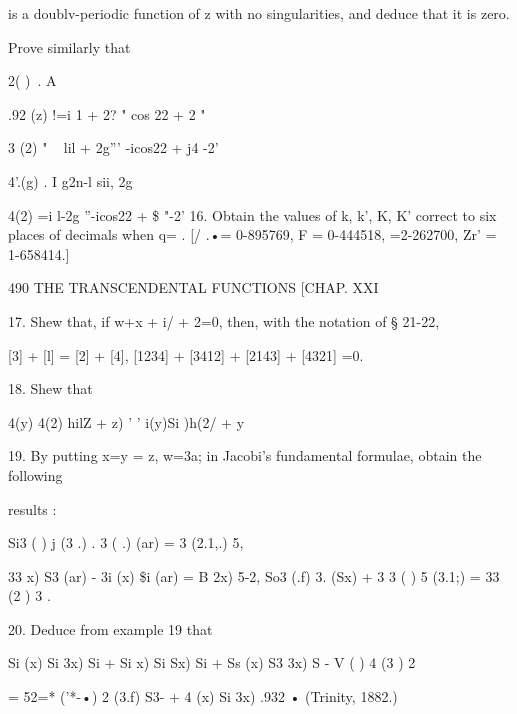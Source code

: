 is a doublv-periodic function of z with no singularities, and deduce
that it is zero.

Prove similarly that

 2( )\ . A%

.92 (z) !=i 1 + 2? " cos 22 + 2 "

 3 (2) " ~ lil + 2g''' -icos22 + j4 -2'

 4'.(g) . I g2n-l sii, 2g

  4(2) =i l-2g ''-icos22 + \$ "-2' 16. Obtain the values of k, k', K,
K' correct to six places of decimals when q= . [/ .•= 0-895769, F =
0-444518, =2-262700, Zr' = 1-658414.]

490 THE TRANSCENDENTAL FUNCTIONS [CHAP. XXI

17. Shew that, if w+x + i/ + 2=0, then, with the notation of § 21-22,

[3] + [l] = [2] + [4], [1234] + [3412] + [2143] + [4321] =0.

18. Shew that

 4(y) 4(2) hilZ + z) ' ' i(y)Si )h(2/ + y

19. By putting x=y = z, w=3a; in Jacobi's fundamental formulae, obtain
the following

results :

Si3 ( ) j (3 .) . 3 ( .) (ar) = 3 (2.1,.) 5,

 33 x) S3 (ar) - 3i (x) \$i (ar) = B 2x) 5-2, So3 (.f) 3. (Sx) + 3 3 (
) 5 (3.1;) = 33 (2 ) 3 .

20. Deduce from example 19 that

 Si (x) Si 3x) Si + Si x) Si Sx) Si + Ss (x) S3 3x) S - V ( ) 4 (3 ) 2

= 52=* ('*-•) 2 (3.f) S3- + 4 (x) Si 3x) .932 • (Trinity, 1882.)

